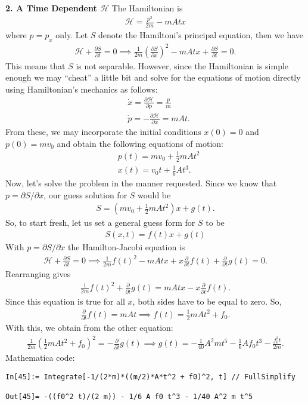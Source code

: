 \documentclass{article}
\theoremstyle{definition}
\newcommand{\p}{\partial}
\newcommand{\ham}{\mathcal{H}}
\newcommand{\f}[2]{\frac{#1}{#2}}
\newcommand{\lp}{\left(}
\newcommand{\rp}{\right)}
\begin{document}
\noindent \textbf{2. A Time Dependent $\ham$}
The Hamiltonian is 
\begin{align*}
\ham = \f{p^2}{2m} - mAtx
\end{align*}
where $p = p_x$ only. Let $S$ denote the Hamiltoni's principal equation, then we have
\begin{align*}
\ham + \f{\p S}{\p t} = 0 \implies \f{1}{2m}\lp \f{\p S}{\p x} \rp^2 - mAtx + \f{\p S}{\p t} = 0.
\end{align*}
This means that $S$ is not separable. However, since the Hamiltonian is simple enough we may ``cheat'' a little bit and solve for the equations of motion directly using Hamiltonian's mechanics as follows:
\begin{align*}
&\dot x = \f{\p \ham}{\p p} = \f{p}{m}\\
&\dot p = -\f{\p \ham }{\p x} = mAt. 
\end{align*}
From these, we may incorporate the initial conditions $x(0) = 0$ and $p(0) = mv_0$ and obtain the following equations of motion:
\begin{align*}
&p(t)= mv_0 + \f{1}{2}mAt^2 \\
&x(t)= v_0t + \f{1}{6}At^3.
\end{align*}
Now, let's solve the problem in the manner requested. Since we know that $p = \p S/ \p x$, our guess solution for $S$ would be 
\begin{align*}
S= \lp mv_0 + \f{1}{2}mAt^2\rp x + g(t).
\end{align*}
So, to start fresh, let us set a general guess form for $S$ to be
\begin{align*}
\boxed{S(x,t) = f(t) x + g(t)}
\end{align*}
With $p = \p S/\p x$ the Hamilton-Jacobi equation is 
\begin{align*}
\ham + \f{\p S}{\p t} = 0 \implies \f{1}{2m} f(t)^2 - mA t x +  x\f{\p}{\p t} f(t)   + \f{\p}{\p t} g(t) = 0.
\end{align*}
Rearranging gives
\begin{align*}
\f{1}{2m}f(t)^2 + \f{\p}{\p t}g(t) = mAtx - x \f{\p}{\p t}f(t).
\end{align*}
Since this equation is true for all $x$, both sides have to be equal to zero. So,
\begin{align*}
\f{\p}{\p t}f(t) = mAt \implies f(t) = \f{1}{2}mAt^2 + f_0. 
\end{align*}
With this, we obtain from the other equation:
\begin{align*}
\f{1}{2m} \lp \f{1}{2}mAt^2 + f_0 \rp^2 = -\f{\p}{\p t}g(t)\implies g(t)
 = -\f{1}{40}A^2 mt^5 - \f{1}{6}A f_0 t^3 - \f{f_0^2 t}{2m}.
\end{align*}
Mathematica code:
\begin{lstlisting}
In[45]:= Integrate[-1/(2*m)*((m/2)*A*t^2 + f0)^2, t] // FullSimplify

Out[45]= -((f0^2 t)/(2 m)) - 1/6 A f0 t^3 - 1/40 A^2 m t^5
\end{lstlisting}
\end{document}
